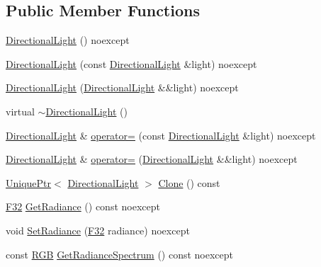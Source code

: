 \subsection*{Public Member Functions}
\begin{DoxyCompactItemize}
\item 
\hyperlink{classmage_1_1_directional_light_a688b26cb1d12d55258ae34bbac498465}{Directional\+Light} () noexcept
\item 
\hyperlink{classmage_1_1_directional_light_a0a89074b94178d9c3d7914d85ca5fdaa}{Directional\+Light} (const \hyperlink{classmage_1_1_directional_light}{Directional\+Light} \&light) noexcept
\item 
\hyperlink{classmage_1_1_directional_light_af2871e48659e62f8b5278cc0d601a4bc}{Directional\+Light} (\hyperlink{classmage_1_1_directional_light}{Directional\+Light} \&\&light) noexcept
\item 
virtual \hyperlink{classmage_1_1_directional_light_a967d33c11a1477c01ce4c9720337caeb}{$\sim$\+Directional\+Light} ()
\item 
\hyperlink{classmage_1_1_directional_light}{Directional\+Light} \& \hyperlink{classmage_1_1_directional_light_acf66f214974d9fb60844c16e02c49b22}{operator=} (const \hyperlink{classmage_1_1_directional_light}{Directional\+Light} \&light) noexcept
\item 
\hyperlink{classmage_1_1_directional_light}{Directional\+Light} \& \hyperlink{classmage_1_1_directional_light_a6affb7a9c6e9a509a2c80944d99b3506}{operator=} (\hyperlink{classmage_1_1_directional_light}{Directional\+Light} \&\&light) noexcept
\item 
\hyperlink{namespacemage_a3316d7143a973e37adf1110f2e80ca31}{Unique\+Ptr}$<$ \hyperlink{classmage_1_1_directional_light}{Directional\+Light} $>$ \hyperlink{classmage_1_1_directional_light_a779c49e066215cff9f80ed40048dfc62}{Clone} () const
\item 
\hyperlink{namespacemage_aa97e833b45f06d60a0a9c4fc22ae02c0}{F32} \hyperlink{classmage_1_1_directional_light_a73fe73ce8184bf32379ead1e00b34c9f}{Get\+Radiance} () const noexcept
\item 
void \hyperlink{classmage_1_1_directional_light_ac8b63948d393696ca8745c799328be84}{Set\+Radiance} (\hyperlink{namespacemage_aa97e833b45f06d60a0a9c4fc22ae02c0}{F32} radiance) noexcept
\item 
const \hyperlink{structmage_1_1_r_g_b}{R\+GB} \hyperlink{classmage_1_1_directional_light_a137cef14d20df2c907884a04ae2019ff}{Get\+Radiance\+Spectrum} () const noexcept
\item 

\end{DoxyCompactItemize}

